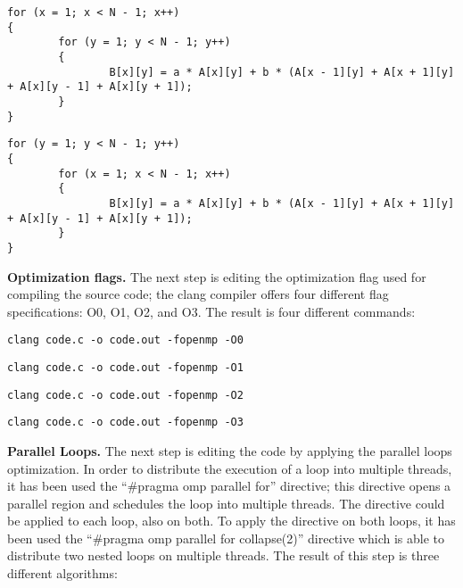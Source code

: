 \documentclass[conference]{IEEEtran}
\newcommand{\mypar}[1]{{\bf #1.}}
\begin{document}
\begin{lstlisting}[caption={The starting algorithm},label={lst:loop-interchange-x-y}]
for (x = 1; x < N - 1; x++)
{
		for (y = 1; y < N - 1; y++)
		{
				B[x][y] = a * A[x][y] + b * (A[x - 1][y] + A[x + 1][y] + A[x][y - 1] + A[x][y + 1]);
		}
}
\end{lstlisting}

\begin{lstlisting}[caption={A new algorithm with x and y swapped},label={lst:loop-interchange-y-x}]
for (y = 1; y < N - 1; y++)
{
		for (x = 1; x < N - 1; x++)
		{
				B[x][y] = a * A[x][y] + b * (A[x - 1][y] + A[x + 1][y] + A[x][y - 1] + A[x][y + 1]);
		}
}
\end{lstlisting}

\mypar{Optimization flags}
The next step is editing the optimization flag used for compiling the source code; the clang compiler offers four different flag specifications: O0, O1, O2, and O3. The result is four different commands:

\setcounter{lstlisting}{0}
\renewcommand{\lstlistingname}{Command}

\begin{lstlisting}[caption={Flag -O0},label={lst:optimization-flags-0}]
clang code.c -o code.out -fopenmp -O0
\end{lstlisting}

\begin{lstlisting}[caption={Flag -O1},label={lst:optimization-flags-1}]
clang code.c -o code.out -fopenmp -O1
\end{lstlisting}

\begin{lstlisting}[caption={Flag -O2},label={lst:optimization-flags-2}]
clang code.c -o code.out -fopenmp -O2
\end{lstlisting}

\begin{lstlisting}[caption={Flag -O3},label={lst:optimization-flags-3}]
clang code.c -o code.out -fopenmp -O3
\end{lstlisting}

\mypar{Parallel Loops}
The next step is editing the code by applying the parallel loops optimization. In order to distribute the execution of a loop into multiple threads, it has been used the ``#pragma omp parallel for'' \cite{omp-parallel}\cite{omp-for} directive; this directive opens a parallel region and schedules the loop into multiple threads. The directive could be applied to each loop, also on both. To apply the directive on both loops, it has been used the ``#pragma omp parallel for collapse(2)'' \cite{omp-collapse} directive which is able to distribute two nested loops on multiple threads. The result of this step is three different algorithms:
\end{document}
